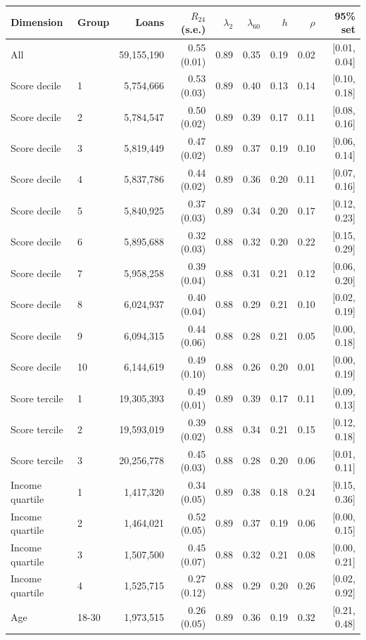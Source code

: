 \begin{tabular}{llrrrrrrr}
\toprule
Dimension & Group & Loans & $R_{24}$ (s.e.) & $\lambda_{2}$ & $\lambda_{60}$ & $h$ & $\rho$ & 95\% set \\
\midrule
All &  & 59,155,190 & 0.55 (0.01) & 0.89 & 0.35 & 0.19 & 0.02 & [0.01, 0.04] \\
\midrule
Score decile & 1 & 5,754,666 & 0.53 (0.03) & 0.89 & 0.40 & 0.13 & 0.14 & [0.10, 0.18] \\
Score decile & 2 & 5,784,547 & 0.50 (0.02) & 0.89 & 0.39 & 0.17 & 0.11 & [0.08, 0.16] \\
Score decile & 3 & 5,819,449 & 0.47 (0.02) & 0.89 & 0.37 & 0.19 & 0.10 & [0.06, 0.14] \\
Score decile & 4 & 5,837,786 & 0.44 (0.02) & 0.89 & 0.36 & 0.20 & 0.11 & [0.07, 0.16] \\
Score decile & 5 & 5,840,925 & 0.37 (0.03) & 0.89 & 0.34 & 0.20 & 0.17 & [0.12, 0.23] \\
Score decile & 6 & 5,895,688 & 0.32 (0.03) & 0.88 & 0.32 & 0.20 & 0.22 & [0.15, 0.29] \\
Score decile & 7 & 5,958,258 & 0.39 (0.04) & 0.88 & 0.31 & 0.21 & 0.12 & [0.06, 0.20] \\
Score decile & 8 & 6,024,937 & 0.40 (0.04) & 0.88 & 0.29 & 0.21 & 0.10 & [0.02, 0.19] \\
Score decile & 9 & 6,094,315 & 0.44 (0.06) & 0.88 & 0.28 & 0.21 & 0.05 & [0.00, 0.18] \\
Score decile & 10 & 6,144,619 & 0.49 (0.10) & 0.88 & 0.26 & 0.20 & 0.01 & [0.00, 0.19] \\
\midrule
Score tercile & 1 & 19,305,393 & 0.49 (0.01) & 0.89 & 0.39 & 0.17 & 0.11 & [0.09, 0.13] \\
Score tercile & 2 & 19,593,019 & 0.39 (0.02) & 0.88 & 0.34 & 0.21 & 0.15 & [0.12, 0.18] \\
Score tercile & 3 & 20,256,778 & 0.45 (0.03) & 0.88 & 0.28 & 0.20 & 0.06 & [0.01, 0.11] \\
\midrule
Income quartile & 1 & 1,417,320 & 0.34 (0.05) & 0.89 & 0.38 & 0.18 & 0.24 & [0.15, 0.36] \\
Income quartile & 2 & 1,464,021 & 0.52 (0.05) & 0.89 & 0.37 & 0.19 & 0.06 & [0.00, 0.15] \\
Income quartile & 3 & 1,507,500 & 0.45 (0.07) & 0.88 & 0.32 & 0.21 & 0.08 & [0.00, 0.21] \\
Income quartile & 4 & 1,525,715 & 0.27 (0.12) & 0.88 & 0.29 & 0.20 & 0.26 & [0.02, 0.92] \\
\midrule
Age & 18-30 & 1,973,515 & 0.26 (0.05) & 0.89 & 0.36 & 0.19 & 0.32 & [0.21, 0.48] \\

\end{tabular}
